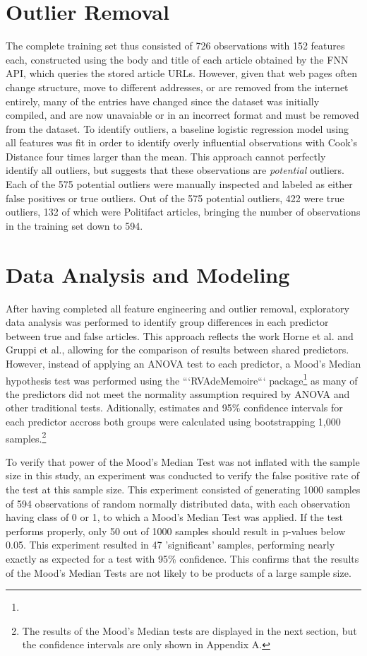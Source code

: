 \documentclass[../thesis.tex]{subfiles}
\begin{document}
\section{Outlier Removal}

The complete training set thus consisted of 726 observations with 152 features each, constructed using the body and title of each article obtained by the FNN API, which queries the stored article URLs. However, given that web pages often change structure, move to different addresses, or are removed from the internet entirely, many of the entries have changed since the dataset was initially compiled, and are now unavaiable or in an incorrect format and must be removed from the dataset. To identify outliers, a baseline logistic regression model using all features was fit in order to identify overly influential observations with Cook's Distance four times larger than the mean. This approach cannot perfectly identify all outliers, but suggests that these observations are \emph{potential} outliers. Each of the 575 potential outliers were manually inspected and labeled as either false positives or true outliers. Out of the 575 potential outliers, 422 were true outliers, 132 of which were Politifact articles, bringing the number of observations in the training set down to 594.

\section{Data Analysis and Modeling}

After having completed all feature engineering and outlier removal, exploratory data analysis was performed to identify group differences in each predictor between true and false articles. This approach reflects the work Horne et al. and Gruppi et al., allowing for the comparison of results between shared predictors. However, instead of applying an ANOVA test to each predictor, a Mood's Median hypothesis test was performed using the ```RVAdeMemoire``` package\footnote{} as many of the predictors did not meet the normality assumption required by ANOVA and other traditional tests. Aditionally, estimates and 95\% confidence intervals for each predictor accross both groups were calculated using bootstrapping 1,000 samples.\footnote{The results of the Mood's Median tests are displayed in the next section, but the confidence intervals are only shown in Appendix A.}

To verify that power of the Mood's Median Test was not inflated with the sample size in this study, an experiment was conducted to verify the false positive rate of the test at this sample size. This experiment consisted of generating 1000 samples of 594 observations of random normally distributed data, with each observation having class of 0 or 1, to which a Mood's Median Test was applied. If the test performs properly, only 50 out of 1000 samples should result in p-values below 0.05. This experiment resulted in 47 'significant' samples, performing nearly exactly as expected for a test with 95\% confidence. This confirms that the results of the Mood's Median Tests are not likely to be products of a large sample size.
\end{document}
